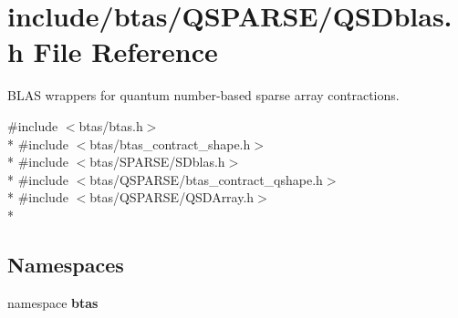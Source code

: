 \section{include/btas/\-Q\-S\-P\-A\-R\-S\-E/\-Q\-S\-Dblas.h File Reference}
\label{d3/d2f/QSDblas_8h}


B\-L\-A\-S wrappers for quantum number-\/based sparse array contractions.  


{\ttfamily \#include $<$btas/btas.\-h$>$}\\*
{\ttfamily \#include $<$btas/btas\-\_\-contract\-\_\-shape.\-h$>$}\\*
{\ttfamily \#include $<$btas/\-S\-P\-A\-R\-S\-E/\-S\-Dblas.\-h$>$}\\*
{\ttfamily \#include $<$btas/\-Q\-S\-P\-A\-R\-S\-E/btas\-\_\-contract\-\_\-qshape.\-h$>$}\\*
{\ttfamily \#include $<$btas/\-Q\-S\-P\-A\-R\-S\-E/\-Q\-S\-D\-Array.\-h$>$}\\*
\subsection*{Namespaces}
\begin{DoxyCompactItemize}
\item 
namespace {\bf btas}
\end{DoxyCompactItemize}
